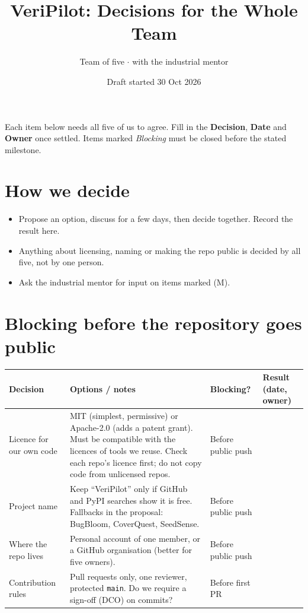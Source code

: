 \documentclass[11pt,a4paper]{article}
\title{VeriPilot: Decisions for the Whole Team}
\author{Team of five $\cdot$ with the industrial mentor}
\date{Draft started 30 Oct 2026}
\begin{document}
\maketitle

Each item below needs all five of us to agree. Fill in the \textbf{Decision}, \textbf{Date} and \textbf{Owner} once settled. Items marked \emph{Blocking} must be closed before the stated milestone.

\section*{How we decide}
\begin{itemize}[nosep]
  \item Propose an option, discuss for a few days, then decide together. Record the result here.
  \item Anything about licensing, naming or making the repo public is decided by all five, not by one person.
  \item Ask the industrial mentor for input on items marked (M).
\end{itemize}

\section{Blocking before the repository goes public}
\begin{longtable}{p{3.2cm} p{5.3cm} p{2.2cm} p{3.8cm}}
\toprule
\textbf{Decision} & \textbf{Options / notes} & \textbf{Blocking?} & \textbf{Result (date, owner)} \\
\midrule
\endhead
Licence for our own code & MIT (simplest, permissive) or Apache-2.0 (adds a patent grant). Must be compatible with the licences of tools we reuse. Check each repo's licence first; do not copy code from unlicensed repos. & Before public push & \\
Project name & Keep ``VeriPilot'' only if GitHub and PyPI searches show it is free. Fallbacks in the proposal: BugBloom, CoverQuest, SeedSense. & Before public push & \\
Where the repo lives & Personal account of one member, or a GitHub organisation (better for five owners). & Before public push & \\
Contribution rules & Pull requests only, one reviewer, protected \texttt{main}. Do we require a sign-off (DCO) on commits? & Before first PR & \\
\bottomrule
\end{longtable}
\end{document}
